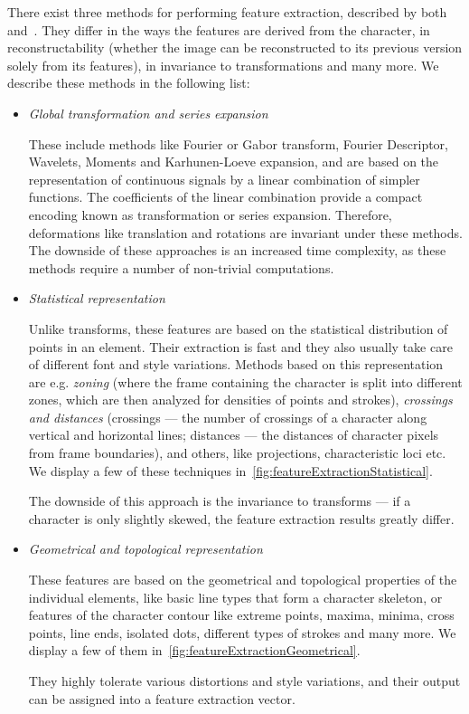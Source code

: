 There exist three methods for performing feature extraction, described by both~\citet{featureExtractionBook} and~\citet{featureExtractiontext}. They differ in the ways the features are derived from the character, in reconstructability (whether the image can be reconstructed to its previous version solely from its features), in invariance to transformations and many more. We describe these methods in the following list:

\begin{itemize}

\item \emph{Global transformation and series expansion}

These include methods like Fourier or Gabor transform, Fourier Descriptor, Wavelets, Moments and Karhunen-Loeve expansion, and are based on the representation of continuous signals by a linear combination of simpler functions. The coefficients of the linear combination provide a compact encoding known as transformation or series expansion. Therefore, deformations like translation and rotations are invariant under these methods. The downside of these approaches is an increased time complexity, as these methods require a number of non-trivial computations.

\item \emph{Statistical representation}

Unlike transforms, these features are based on the statistical distribution of points in an element. Their extraction is fast and they also usually take care of different font and style variations. Methods based on this representation are e.g. \emph{zoning} (where the frame containing the character is split into different zones, which are then analyzed for densities of points and strokes), \emph{crossings and distances} (crossings --- the number of crossings of a character along vertical and horizontal lines; distances --- the distances of character pixels from frame boundaries), and others, like projections, characteristic loci etc. We display a few of these techniques in~\cref{fig:featureExtractionStatistical}.

The downside of this approach is the invariance to transforms --- if a character is only slightly skewed, the feature extraction results greatly differ.

\item \emph{Geometrical and topological representation}

These features are based on the geometrical and topological properties of the individual elements, like basic line types that form a character skeleton, or features of the character contour like extreme points, maxima, minima, cross points, line ends, isolated dots, different types of strokes and many more. We display a few of them in~\cref{fig:featureExtractionGeometrical}.

They highly tolerate various distortions and style variations, and their output can be assigned into a feature extraction vector.

\end{itemize}

